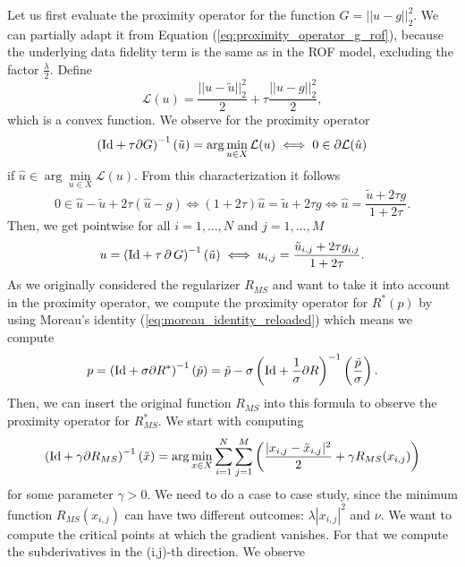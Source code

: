 \documentclass[abstracton]{scrreprt}
\begin{document}
            Let us first evaluate the proximity operator for the function $G = ||u - g||_{2}^{2}$. We can partially adapt it from Equation (\ref{eq:proximity_operator_g_rof}), because the underlying data fidelity term is the same as in the ROF model, excluding the factor $\frac{\lambda}{2}$. Define
                $$
                    \mathcal{L}(u) = \frac{||u - \tilde{u}||_{2}^{2}}{2} + \tau \frac{||u - g||_{2}^{2}}{2},
                $$
            which is a convex function. We observe for the proximity operator
                $$
                    \left( \textnormal{Id} + \tau \partial G \right)^{-1}(\tilde{u}) = \arg \min_{u \in X} \mathcal{L}(u) \iff 0 \in \partial \mathcal{L}(\hat{u})
                $$
            if $\hat{u} \in \arg\min\limits_{u \in X} \mathcal{L}(u)$. From this characterization it follows
                $$
                    0 \in \hat{u} - \tilde{u} + 2\tau (\hat{u} - g) \iff (1 + 2\tau)\hat{u} = \tilde{u} + 2\tau g \iff \hat{u} = \frac{\tilde{u} + 2\tau g}{1 + 2\tau}.
                $$
            Then, we get pointwise for all $i = 1, ..., N$ and $j = 1, ..., M$
                $$
                    u = \left( \textnormal{Id} + \tau\,\partial\,G \right)^{-1}(\tilde{u}) \iff u_{i,j} = \frac{\tilde{u}_{i,j} + 2\tau g_{i,j}}{1 + 2\tau}.
                $$
            As we originally considered the regularizer $R_{MS}$ and want to take it into account in the proximity operator, we compute the proximity operator for $R^{\ast}(p)$ by using Moreau's identity (\ref{eq:moreau_identity_reloaded}) which means we compute
                \begin{equation}
                    p = \left( \textnormal{Id} + \sigma \partial R^{\ast} \right)^{-1}(\tilde{p}) = \tilde{p} - \sigma \left( \textnormal{Id} + \frac{1}{\sigma} \partial R \right)^{-1} \left(\frac{\tilde{p}}{\sigma} \right).
                \label{eq:moreau_mumford_shah_regularizer}
                \end{equation}
            Then, we can insert the original function $R_{MS}$ into this formula to observe the proximity operator for $R^{\ast}_{MS}$. We start with computing
                $$
                    \left( \textnormal{Id} + \gamma\partial R_{MS} \right)^{-1}(\tilde{x}) = \arg \min_{x \in X} \sum_{i = 1}^{N} \sum_{j = 1}^{M} \left( \frac{|x_{i,j} - \tilde{x}_{i,j}|^{2}}{2} + \gamma R_{MS}(x_{i,j}) \right)
                $$
            for some parameter $\gamma > 0$. We need to do a case to case study, since the minimum function $R_{MS}(x_{i,j})$ can have two different outcomes: $\lambda |x_{i,j}|^{2}$ and $\nu$. We want to compute the critical points at which the gradient vanishes. For that we compute the subderivatives in the (i,j)-th direction. We observe
\end{document}
